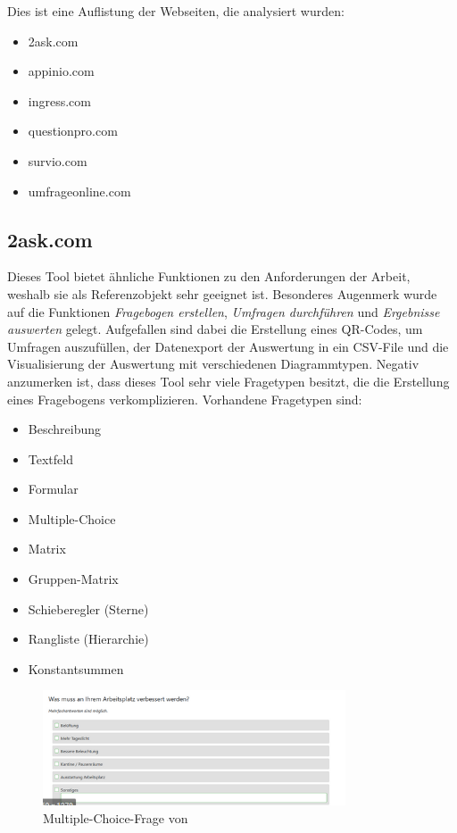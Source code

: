 Dies ist eine Auflistung der Webseiten, die analysiert wurden:
\begin{itemize}
    \item 2ask.com \cite{noauthor_fragebogen_nodate-2}
    \item appinio.com \cite{noauthor_fragebogen_nodate-3}
    \item ingress.com \cite{noauthor_fragebogen_nodate-4}
    \item questionpro.com \cite{noauthor_fragebogen_nodate-5}
    \item survio.com \cite{noauthor_fragebogen_nodate-6}
    \item umfrageonline.com \cite{noauthor_fragebogen_nodate-7}
\end{itemize}

\subsection{2ask.com}
Dieses Tool bietet ähnliche Funktionen zu den Anforderungen der Arbeit, weshalb sie als Referenzobjekt sehr geeignet ist.
Besonderes Augenmerk wurde auf die Funktionen \textit{Fragebogen erstellen}, \textit{Umfragen durchführen} und \textit{Ergebnisse auswerten} gelegt.
Aufgefallen sind dabei die Erstellung eines QR-Codes, um Umfragen auszufüllen, der 
Datenexport der Auswertung in ein CSV-File und die Visualisierung der Auswertung mit 
verschiedenen Diagrammtypen. Negativ anzumerken ist, dass dieses Tool sehr viele Fragetypen besitzt, die die 
Erstellung eines Fragebogens verkomplizieren. \cite{noauthor_fragebogen_nodate-2}
\newline
Vorhandene Fragetypen sind:
\begin{itemize}
    \item Beschreibung
    \item Textfeld
    \item Formular
    \item Multiple-Choice
    \item Matrix
    \item Gruppen-Matrix
    \item Schieberegler (Sterne)
    \item Rangliste (Hierarchie)
    \item Konstantsummen
\end{itemize}

\begin{figure}[H]
    \includegraphics[width=0.8\textwidth]{pics/2ask_com.PNG}
    \centering
    \caption{Multiple-Choice-Frage von \cite{noauthor_fragebogen_nodate-2} }
    \label{fig:umfeld1}
\end{figure}

